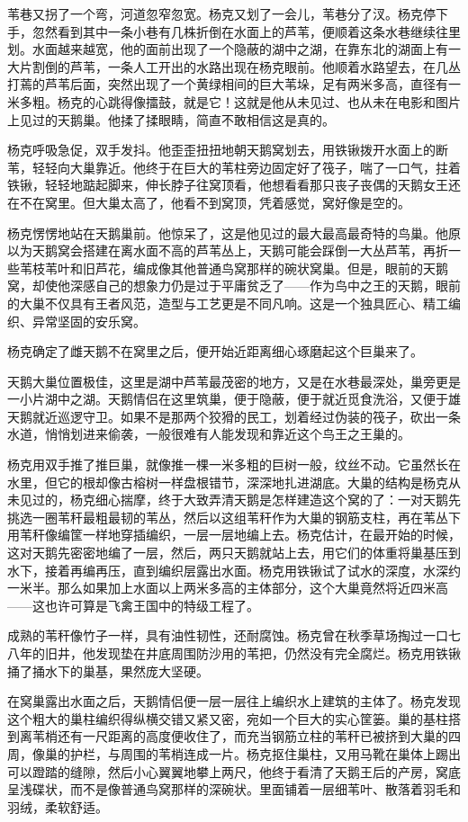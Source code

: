 \par 苇巷又拐了一个弯，河道忽窄忽宽。杨克又划了一会儿，苇巷分了汊。杨克停下手，忽然看到其中一条小巷有几株折倒在水面上的芦苇，便顺着这条水巷继续往里划。水面越来越宽，他的面前出现了一个隐蔽的湖中之湖，在靠东北的湖面上有一大片割倒的芦苇，一条人工开出的水路出现在杨克眼前。他顺着水路望去，在几丛打蔫的芦苇后面，突然出现了一个黄绿相间的巨大苇垛，足有两米多高，直径有一米多粗。杨克的心跳得像擂鼓，就是它！这就是他从未见过、也从未在电影和图片上见过的天鹅巢。他揉了揉眼睛，简直不敢相信这是真的。
\par 杨克呼吸急促，双手发抖。他歪歪扭扭地朝天鹅窝划去，用铁锹拨开水面上的断苇，轻轻向大巢靠近。他终于在巨大的苇柱旁边固定好了筏子，喘了一口气，拄着铁锹，轻轻地踮起脚来，伸长脖子往窝顶看，他想看看那只丧子丧偶的天鹅女王还在不在窝里。但大巢太高了，他看不到窝顶，凭着感觉，窝好像是空的。
\par 杨克愣愣地站在天鹅巢前。他惊呆了，这是他见过的最大最高最奇特的鸟巢。他原以为天鹅窝会搭建在离水面不高的芦苇丛上，天鹅可能会踩倒一大丛芦苇，再折一些苇枝苇叶和旧芦花，编成像其他普通鸟窝那样的碗状窝巢。但是，眼前的天鹅窝，却使他深感自己的想象力仍是过于平庸贫乏了——作为鸟中之王的天鹅，眼前的大巢不仅具有王者风范，造型与工艺更是不同凡响。这是一个独具匠心、精工编织、异常坚固的安乐窝。
\par 杨克确定了雌天鹅不在窝里之后，便开始近距离细心琢磨起这个巨巢来了。
\par 天鹅大巢位置极佳，这里是湖中芦苇最茂密的地方，又是在水巷最深处，巢旁更是一小片湖中之湖。天鹅情侣在这里筑巢，便于隐蔽，便于就近觅食洗浴，又便于雄天鹅就近巡逻守卫。如果不是那两个狡猾的民工，划着经过伪装的筏子，砍出一条水道，悄悄划进来偷袭，一般很难有人能发现和靠近这个鸟王之王巢的。
\par 杨克用双手推了推巨巢，就像推一棵一米多粗的巨树一般，纹丝不动。它虽然长在水里，但它的根却像古榕树一样盘根错节，深深地扎进湖底。大巢的结构是杨克从未见过的，杨克细心揣摩，终于大致弄清天鹅是怎样建造这个窝的了：一对天鹅先挑选一圈苇秆最粗最韧的苇丛，然后以这组苇秆作为大巢的钢筋支柱，再在苇丛下用苇秆像编筐一样地穿插编织，一层一层地编上去。杨克估计，在最开始的时候，这对天鹅先密密地编了一层，然后，两只天鹅就站上去，用它们的体重将巢基压到水下，接着再编再压，直到编织层露出水面。杨克用铁锹试了试水的深度，水深约一米半。那么如果加上水面以上两米多高的主体部分，这个大巢竟然将近四米高——这也许可算是飞禽王国中的特级工程了。
\par 成熟的苇秆像竹子一样，具有油性韧性，还耐腐蚀。杨克曾在秋季草场掏过一口七八年的旧井，他发现垫在井底周围防沙用的苇把，仍然没有完全腐烂。杨克用铁锹捅了捅水下的巢基，果然庞大坚硬。
\par 在窝巢露出水面之后，天鹅情侣便一层一层往上编织水上建筑的主体了。杨克发现这个粗大的巢柱编织得纵横交错又紧又密，宛如一个巨大的实心筐篓。巢的基柱搭到离苇梢还有一尺距离的高度便收住了，而充当钢筋立柱的苇秆已被挤到大巢的四周，像巢的护栏，与周围的苇梢连成一片。杨克抠住巢柱，又用马靴在巢体上踢出可以蹬踏的缝隙，然后小心翼翼地攀上两尺，他终于看清了天鹅王后的产房，窝底呈浅碟状，而不是像普通鸟窝那样的深碗状。里面铺着一层细苇叶、散落着羽毛和羽绒，柔软舒适。
